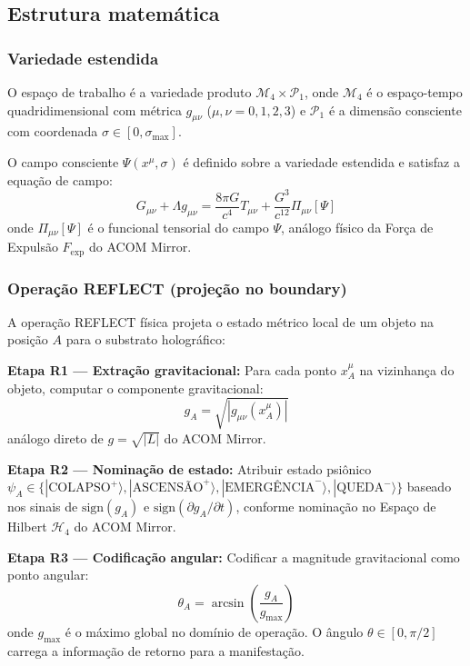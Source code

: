 \documentclass[12pt,a4paper]{article}
\newcommand{\Mcal}{\mathcal{M}_4}
\newcommand{\Pcal}{\mathcal{P}_1}
\begin{document}
\subsection{Estrutura matemática}

\subsubsection{Variedade estendida}

O espaço de trabalho é a variedade produto
$\Mcal \times \Pcal$, onde $\Mcal$ é o espaço-tempo
quadridimensional com métrica $g_{\mu\nu}$ ($\mu, \nu =
0,1,2,3$) e $\Pcal$ é a dimensão consciente com coordenada
$\sigma \in [0, \sigma_{\max}]$.

O campo consciente $\Psi(x^\mu, \sigma)$ é definido sobre a
variedade estendida e satisfaz a equação de campo:
\begin{equation}
G_{\mu\nu} + \Lambda g_{\mu\nu} = \frac{8\pi G}{c^4}
  T_{\mu\nu} + \frac{G^3}{c^{12}} \Pi_{\mu\nu}[\Psi]
\label{eq:campo}
\end{equation}
onde $\Pi_{\mu\nu}[\Psi]$ é o funcional tensorial do campo
$\Psi$, análogo físico da Força de Expulsão $F_{\text{exp}}$
do ACOM Mirror.

\subsubsection{Operação REFLECT (projeção no boundary)}

A operação REFLECT física projeta o estado métrico local de um
objeto na posição $A$ para o substrato holográfico:

\textbf{Etapa R1 --- Extração gravitacional:} Para cada ponto
$x^\mu_A$ na vizinhança do objeto, computar o componente
gravitacional:
\begin{equation}
g_A = \sqrt{|g_{\mu\nu}(x^\mu_A)|}
\end{equation}
análogo direto de $g = \sqrt{|L|}$ do ACOM Mirror.

\textbf{Etapa R2 --- Nominação de estado:} Atribuir estado
psiônico $\psi_A \in \{|\text{COLAPSO}^+\rangle,
|\text{ASCENSÃO}^+\rangle, |\text{EMERGÊNCIA}^-\rangle,
|\text{QUEDA}^-\rangle\}$ baseado nos sinais de
$\text{sign}(g_A)$ e $\text{sign}(\partial g_A / \partial t)$,
conforme nominação no Espaço de Hilbert $\mathcal{H}_4$ do
ACOM Mirror.

\textbf{Etapa R3 --- Codificação angular:} Codificar a
magnitude gravitacional como ponto angular:
\begin{equation}
\theta_A = \arcsin\left(\frac{g_A}{g_{\max}}\right)
\end{equation}
onde $g_{\max}$ é o máximo global no domínio de operação. O
ângulo $\theta \in [0, \pi/2]$ carrega a informação de retorno
para a manifestação.
\end{document}
